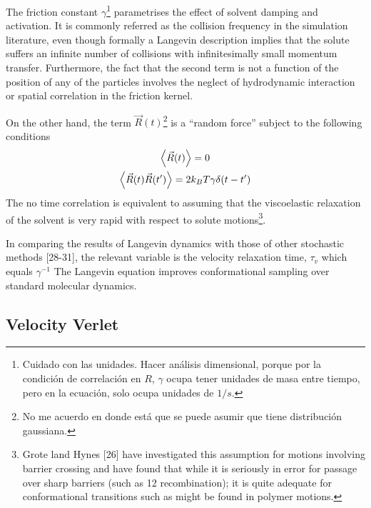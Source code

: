 The friction constant $\gamma$\footnote{Cuidado con las unidades. Hacer análisis dimensional, porque por la condición de correlación en $R$, $\gamma$ ocupa tener unidades de masa entre tiempo, pero en la ecuación, solo ocupa unidades de $1/s$.} parametrises the effect of solvent damping and activation.
It is commonly referred as the collision frequency in the simulation literature, even though formally a Langevin description implies that the solute suffers an infinite number of collisions with infinitesimally small momentum transfer.
Furthermore, the fact that the second term is not a function of the position of any of the particles involves the neglect of hydrodynamic interaction or spatial correlation in the friction kernel\citep{pastorTechniquesApplicationsLangevin1994}.

On the other hand, the term $\vec{R}(t)$\footnote{No me acuerdo en donde está que se puede asumir que tiene distribución gaussiana.} is a ``random force'' subject to the following conditions
\begin{gather}
    \expval{\vec{R}(t)} = 0\label{eqn:LagDynamicNoiseExpval} \\
    \expval{\vec{R}(t)\vec{R}(t')} = 2k_{B}T\gamma\delta\qty(t-t')\label{eqn:LagDynamicNoiseCorrelation} 
\end{gather}
The no time correlation is equivalent to assuming that the viscoelastic relaxation of the solvent is very rapid with respect to solute motions\footnote{Grote land Hynes [26] have investigated this assumption for motions involving barrier crossing and have found that while it is seriously in error for passage over sharp barriers (such as 12 recombination); it is quite adequate for conformational transitions such as might be found in polymer motions.\citep{pastorTechniquesApplicationsLangevin1994}}.

In comparing the results of Langevin dynamics with those of other stochastic methods [28-31], the relevant variable is the velocity relaxation time, $\tau_{v}$ which equals $\gamma^{-1}$\citep{pastorTechniquesApplicationsLangevin1994}
The Langevin equation improves conformational sampling over standard molecular dynamics\citep{paquetMolecularDynamicsMonte2015}.


\subsection{Velocity Verlet}

